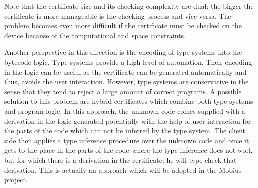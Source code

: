 Note that the certificate size and its checking complexity are dual: the bigger the certificate is more manageable is the checking process and vice versa. 
The problem becomes even more difficult if the certificate must be checked on the device because of the computational and space constraints.
 


  
%  
% 
%        
%     



Another perspective in this direction is the encoding of  type systems into the bytecode logic. 
Type systems provide a high level of automation. Their encoding in the logic can be useful as the certificate can be generated
 automatically and thus, avoids the user interaction. However, type systems are  conservative in the sense 
that they tend to reject a large amount of correct programs. A possible
solution to this problem are hybrid certificates which combine both type
systems and program logic. In this approach, the unknown code comes supplied with a  derivation in the logic generated potentially with the help of user interaction 
for the parts of the  code which can not be inferred by the type system. The client side then applies a type inference procedure over  the
 unknown code and once it gets to the place in the parts of the code where the 
type inference does not work but for which there is a derivation in the certificate, he will type check that derivation.   
This is actually an approach which will be adopted in the Mobius project. 


